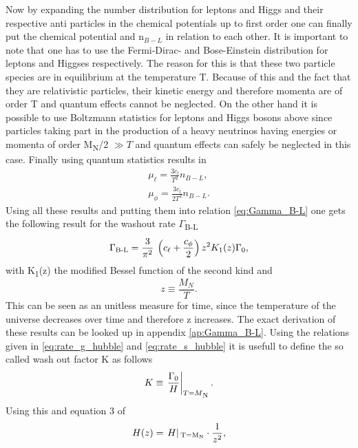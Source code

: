 Now by expanding the number distribution for leptons and Higgs and their respective anti particles in the chemical potentials up to first order one can finally put the chemical potential and n$_{B-L}$ in relation to each other. It is important to note that one has to use the Fermi-Dirac- and Bose-Einstein distribution for leptons and Higgses respectively. The reason for this is that these two particle species are in equilibrium at the temperature T. Because of this and the fact that they are relativistic particles, their kinetic energy and therefore momenta are of order T and quantum effects cannot be neglected. On the other hand it is possible to use Boltzmann statistics for leptons and Higgs bosons above since particles taking part in the production of a heavy neutrinos having energies or momenta of order M\textsubscript{N}/2 $\gg T$ and quantum effects can safely be neglected in this case. Finally using quantum statistics results in
\begin{align}
\mu_\ell=\frac{3c_l}{T^2}n_{B-L},
\label{eq:chempot_l}
\\
\mu_\phi=\frac{3c_l}{2T^2}n_{B-L}.
\label{eq:chempot_phi}
\end{align}
Using all these results and putting them into relation \eqref{eq:Gamma_B-L} one gets the following result for the washout rate $\Gamma$\textsubscript{B-L}
\begin{equation}
	\Gamma\textsubscript{B-L}=\frac{3}{\pi^2}\:\left(c_\ell+\frac{c_\phi}{2}\right)z^2K_1(z)\Gamma_0,
	\label{eq:Gamma_B-l_result}
\end{equation}
with K\textsubscript{1}(z) the modified Bessel function of the second kind and 
\begin{equation}
	z\equiv\frac{M_N}{T}.
\end{equation}
This can be seen as an unitless measure for time, since the temperature of the universe decreases over time and therefore z increases. 
The exact derivation of these results can be looked up in appendix \ref{ap:Gamma_B-L}. \newline
Using the relations given in \eqref{eq:rate_g_hubble} and \eqref{eq:rate_s_hubble} it is usefull to define the so called wash out factor K as follows
\begin{equation}
	K\equiv\left.\frac{\Gamma_0}{H}\right|_{T=M\textsubscript{N}}.
	\label{eq:washout}
\end{equation}
Using this and equation 3 of \cite{Buchmuller:2004nz}
\begin{equation}
	H(z)=\left.H\right|\textsubscript{T=M\textsubscript{N}}\cdot \frac{1}{z^2},
	\label{eq:H_von_z}
\end{equation}
